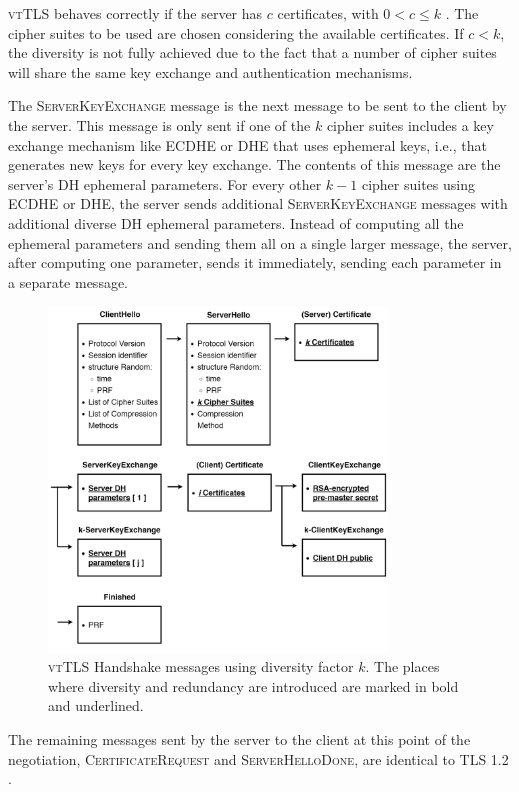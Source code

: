 \documentclass{sig-alternate-05-2015}
\newcommand{\msg}[1]{\textsc{{#1}}}
\begin{document}
\textsc{vtTLS} behaves correctly if the server has $c$ certificates, with $0 < c \leq k$ . The cipher suites to be used are chosen considering the available certificates. If $c < k$, the diversity is not fully achieved due to the fact that a number of cipher suites will share the same %
key exchange and authentication mechanisms.

The \msg{ServerKeyExchange} message is the next message to be sent to the client by the server. This message is only sent if one of the $k$ cipher suites includes a key exchange mechanism like ECDHE or DHE that uses ephemeral keys, i.e., that generates new keys for every key exchange. The contents of this message are the server's DH ephemeral parameters. For every other $k - 1$ cipher suites using ECDHE or DHE, the server sends additional \msg{ServerKeyExchange} messages with additional diverse DH ephemeral parameters.
Instead of computing all the ephemeral parameters and sending them all on a single larger message, the server, after computing one parameter, sends it immediately, sending each parameter in a separate message.

\begin{figure}[t]
\includegraphics[width=9cm]{vttls-handshake}
\centering
\caption{\textsc{vtTLS} Handshake messages using diversity factor $k$. The places where diversity and redundancy are introduced are marked in bold and underlined.} %
\label{fig:vtTLS-example}
\end{figure}

The remaining messages sent by the server to the client at this point of the negotiation, \msg{CertificateRequest} and \msg{ServerHelloDone}, are identical to TLS 1.2 \cite{TLS1.2-5246}.
\end{document}
